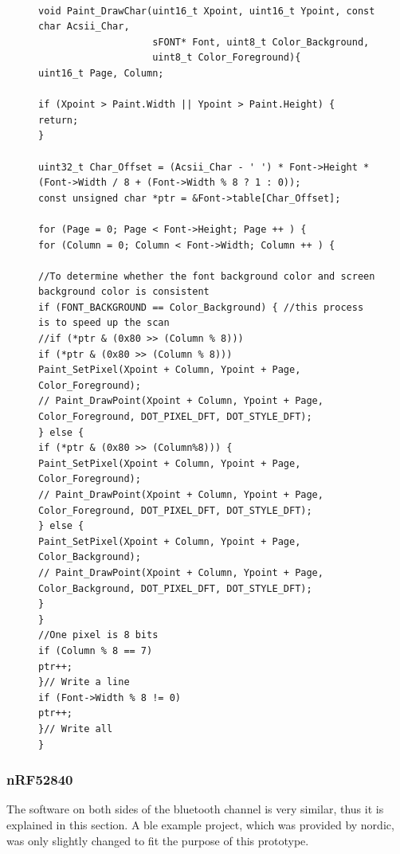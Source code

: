 \begin{figure}[ht!]
\begin{lstlisting}

void Paint_DrawChar(uint16_t Xpoint, uint16_t Ypoint, const char Acsii_Char,
					sFONT* Font, uint8_t Color_Background, 
					uint8_t Color_Foreground){
uint16_t Page, Column;

if (Xpoint > Paint.Width || Ypoint > Paint.Height) {
return;
}

uint32_t Char_Offset = (Acsii_Char - ' ') * Font->Height * (Font->Width / 8 + (Font->Width % 8 ? 1 : 0));
const unsigned char *ptr = &Font->table[Char_Offset];

for (Page = 0; Page < Font->Height; Page ++ ) {
for (Column = 0; Column < Font->Width; Column ++ ) {

//To determine whether the font background color and screen background color is consistent
if (FONT_BACKGROUND == Color_Background) { //this process is to speed up the scan
//if (*ptr & (0x80 >> (Column % 8)))
if (*ptr & (0x80 >> (Column % 8)))
Paint_SetPixel(Xpoint + Column, Ypoint + Page, Color_Foreground);
// Paint_DrawPoint(Xpoint + Column, Ypoint + Page, Color_Foreground, DOT_PIXEL_DFT, DOT_STYLE_DFT);
} else {
if (*ptr & (0x80 >> (Column%8))) {
Paint_SetPixel(Xpoint + Column, Ypoint + Page, Color_Foreground);
// Paint_DrawPoint(Xpoint + Column, Ypoint + Page, Color_Foreground, DOT_PIXEL_DFT, DOT_STYLE_DFT);
} else {
Paint_SetPixel(Xpoint + Column, Ypoint + Page, Color_Background);
// Paint_DrawPoint(Xpoint + Column, Ypoint + Page, Color_Background, DOT_PIXEL_DFT, DOT_STYLE_DFT);
}
}
//One pixel is 8 bits
if (Column % 8 == 7)
ptr++;
}// Write a line
if (Font->Width % 8 != 0)
ptr++;
}// Write all
}
\end{lstlisting}
\end{figure}

\subsubsection{nRF52840}
The software on both sides of the bluetooth channel is very similar, thus it is explained in this section.
A \acs{ble} example project, which was provided by nordic, was only slightly changed to fit the purpose of this prototype.

